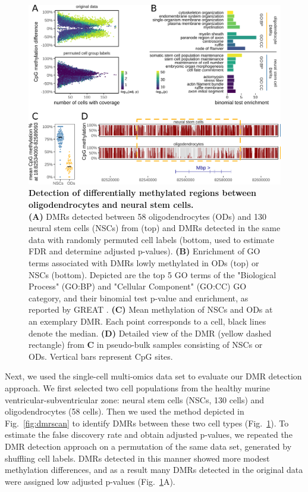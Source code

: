 \documentclass[twocolumn,10pt]{article}
\begin{document}
\begin{figure}[t]
    \begin{center}
        \includegraphics[width=.7\textwidth]{figures/Fig_DMRs.png}
    \end{center}
    \caption{\small \textbf{Detection of differentially methylated regions between oligodendrocytes and neural stem cells.}\\
    \textbf{(A)} DMRs detected between 58 oligodendrocytes (ODs) and 130 neural stem cells (NSCs) from \citep{kremer_scnmt} (top) and DMRs detected in the same data with randomly permuted cell labels (bottom, used to estimate FDR and determine adjusted p-values).
    \textbf{(B)} Enrichment of GO terms associated with DMRs lowly methylated in ODs (top) or NSCs (bottom).
    Depicted are the top 5 GO terms of the "Biological Process" (GO:BP) and "Cellular Component" (GO:CC) GO category, and their binomial test p-value and enrichment, as reported by GREAT \citep{mclean2010great}.
    \textbf{(C)} Mean methylation of NSCs and ODs at an exemplary DMR.
    Each point corresponds to a cell, black lines denote the median.
    \textbf{(D)} Detailed view of the DMR (yellow dashed rectangle) from \textbf{C} in pseudo-bulk samples consisting of NSCs or ODs.
    Vertical bars represent CpG sites.
    }
    \label{fig:dmr}
\end{figure}


Next, we used the single-cell multi-omics data set \citep{kremer_scnmt} to evaluate our DMR detection approach.
We first selected two cell populations from the healthy murine ventricular-subventricular zone: neural stem cells (NSCs, 130 cells) and oligodendrocytes (58 cells).
Then we used the method depicted in Fig.~\ref{fig:dmrscan} to identify DMRs between these two cell types (Fig.~\ref{fig:dmr}).
To estimate the false discovery rate and obtain adjusted p-values, we repeated the DMR detection approach on a permutation of the same data set, generated by shuffling cell labels.
DMRs detected in this manner showed more modest methylation differences, and as a result many DMRs detected in the original data were assigned low adjusted p-values (Fig.~\ref{fig:dmr}A).
\end{document}
